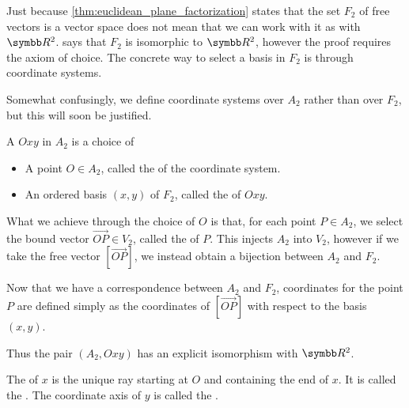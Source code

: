 \begin{definition}\label{def:euclidean_plane_coordinate_system}
  Just because \cref{thm:euclidean_plane_factorization} states that the set \( F_2 \) of free vectors is a vector space does not mean that we can work with it as with \( \R^2 \).  says that \( F_2 \) is isomorphic to \( \R^2 \), however the proof requires the axiom of choice. The concrete way to select a basis in \( F_2 \) is through coordinate systems.

  Somewhat confusingly, we define coordinate systems over \( A_2 \) rather than over \( F_2 \), but this will soon be justified.

  A  \( Oxy \) in \( A_2 \) is a choice of
  \begin{itemize}
    \item A point \( O \in A_2 \), called the  of the coordinate system.
    \item An ordered basis \( (x, y) \) of \( F_2 \), called the  of \( Oxy \).
  \end{itemize}

  What we achieve through the choice of \( O \) is that, for each point \( P \in A_2 \), we select the bound vector \( \Vec{OP} \in V_2 \), called the  of \( P \). This injects \( A_2 \) into \( V_2 \), however if we take the free vector \( [\Vec{OP}] \), we instead obtain a bijection between \( A_2 \) and \( F_2 \).

  Now that we have a correspondence between \( A_2 \) and \( F_2 \), coordinates for the point \( P \) are defined simply as the coordinates of \( [\Vec{OP}] \) with respect to the basis \( (x, y) \).

  Thus the pair \( (A_2, Oxy) \) has an explicit isomorphism with \( \R^2 \).

  The  of \( x \) is the unique ray starting at \( O \) and containing the end of \( x \). It is called the . The coordinate axis of \( y \) is called the .
\end{definition}

